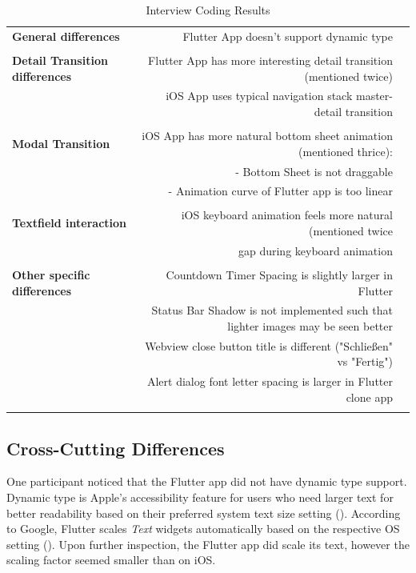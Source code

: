 \begin{table}[!htp]\centering
    \caption{Interview Coding Results}\label{tab:interview_coding_results}
    \scriptsize
    \begin{tabular}{lrr}\toprule
    \textbf{General differences} &Flutter App doesn't support dynamic type \\
    & \\
    \textbf{Detail Transition differences} &Flutter App has more interesting detail transition (mentioned twice) \\
    &iOS App uses typical navigation stack master-detail transition \\
    & \\
    \textbf{Modal Transition} &iOS App has more natural bottom sheet animation (mentioned thrice): \\
    &- Bottom Sheet is not draggable \\
    &- Animation curve of Flutter app is too linear \\
    \textbf{} & \\
    \textbf{Textfield interaction} &iOS keyboard animation feels more natural (mentioned twice \\
    &gap during keyboard animation \\
    & \\
    \textbf{Other specific differences} &Countdown Timer Spacing is slightly larger in Flutter \\
    &Status Bar Shadow is not implemented such that lighter images may be seen better \\
    &Webview close button title is different ("Schließen" vs "Fertig") \\
    &Alert dialog font letter spacing is larger in Flutter clone app \\
    & \\
    \bottomrule
    \end{tabular}
\end{table}

\subsection{Cross-Cutting Differences}
One participant noticed that the Flutter app did not have dynamic type support. 
Dynamic type is Apple's accessibility feature for users who need larger text for better readability based on their preferred system text size setting (\cite{Apple2021b}).
According to Google, Flutter scales \textit{Text} widgets automatically based on the respective OS setting (\cite{Google2021a}).
Upon further inspection, the Flutter app did scale its text, however the scaling factor seemed smaller than on iOS.

